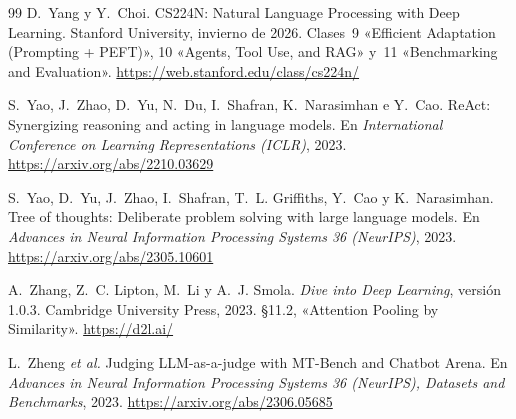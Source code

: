 \begin{thebibliography}{99}
D.~Yang y Y.~Choi.
\newblock CS224N: Natural Language Processing with Deep Learning.
\newblock Stanford University, invierno de 2026. Clases~9 «Efficient Adaptation (Prompting + PEFT)», 10 «Agents, Tool Use, and RAG» y~11 «Benchmarking and Evaluation».
\newblock \url{https://web.stanford.edu/class/cs224n/}

S.~Yao, J.~Zhao, D.~Yu, N.~Du, I.~Shafran, K.~Narasimhan e Y.~Cao.
\newblock ReAct: Synergizing reasoning and acting in language models.
\newblock En \emph{International Conference on Learning Representations (ICLR)}, 2023.
\newblock \url{https://arxiv.org/abs/2210.03629}

S.~Yao, D.~Yu, J.~Zhao, I.~Shafran, T.~L. Griffiths, Y.~Cao y K.~Narasimhan.
\newblock Tree of thoughts: Deliberate problem solving with large language models.
\newblock En \emph{Advances in Neural Information Processing Systems 36 (NeurIPS)}, 2023.
\newblock \url{https://arxiv.org/abs/2305.10601}

A.~Zhang, Z.~C. Lipton, M.~Li y A.~J. Smola.
\newblock \emph{Dive into Deep Learning}, versión 1.0.3.
\newblock Cambridge University Press, 2023. §11.2, «Attention Pooling by Similarity».
\newblock \url{https://d2l.ai/}

L.~Zheng \emph{et al.}
\newblock Judging LLM-as-a-judge with MT-Bench and Chatbot Arena.
\newblock En \emph{Advances in Neural Information Processing Systems 36 (NeurIPS), Datasets and Benchmarks}, 2023.
\newblock \url{https://arxiv.org/abs/2306.05685}

\end{thebibliography}
